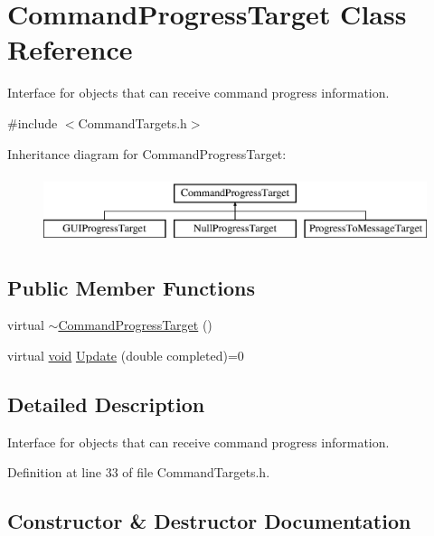 \hypertarget{class_command_progress_target}{}\section{Command\+Progress\+Target Class Reference}
\label{class_command_progress_target}


Interface for objects that can receive command progress information.  




{\ttfamily \#include $<$Command\+Targets.\+h$>$}

Inheritance diagram for Command\+Progress\+Target\+:\begin{figure}[H]
\begin{center}
\leavevmode
\includegraphics[height=2.000000cm]{class_command_progress_target}
\end{center}
\end{figure}
\subsection*{Public Member Functions}
\begin{DoxyCompactItemize}
\item 
virtual \hyperlink{class_command_progress_target_a554c2b8b30f545a8fd6012295defa761}{$\sim$\+Command\+Progress\+Target} ()
\item 
virtual \hyperlink{sound_8c_ae35f5844602719cf66324f4de2a658b3}{void} \hyperlink{class_command_progress_target_afaa593fe05b1668f18edd214f2eca6eb}{Update} (double completed)=0
\end{DoxyCompactItemize}


\subsection{Detailed Description}
Interface for objects that can receive command progress information. 

Definition at line 33 of file Command\+Targets.\+h.



\subsection{Constructor \& Destructor Documentation}
